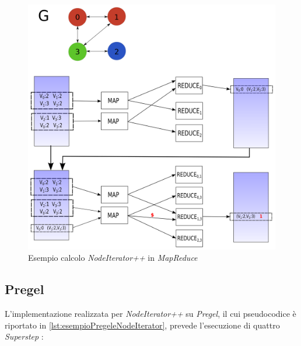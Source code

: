 \documentclass[LaM,binding=0.6cm]{sapthesis}
\begin{document}
\begin{figure}
\centering
\includegraphics[width=1\textwidth]{MR-trianglepp}
\caption{Esempio calcolo \textit{NodeIterator++} in \textit{MapReduce}}
\label{fig:MRNIT}
\end{figure}

\subsection{Pregel}

L'implementazione realizzata per \textit{NodeIterator++} su \textit{Pregel}, il cui pseudocodice è riportato in \ref{lst:esempioPregeleNodeIterator}, prevede l'esecuzione di quattro \textit{Superstep} :
\end{document}
